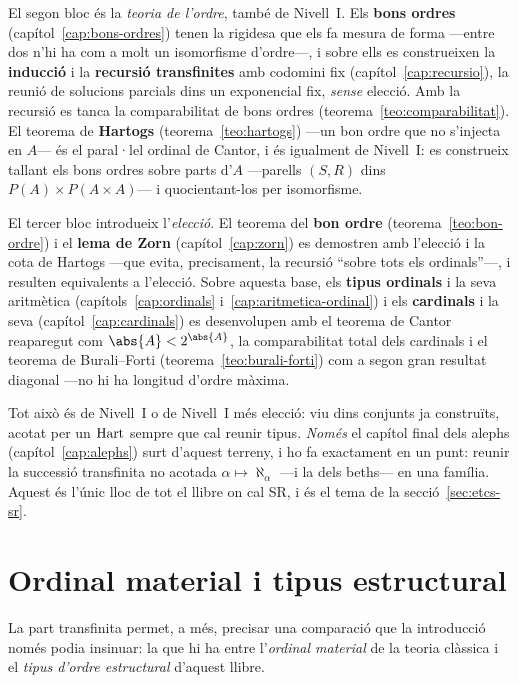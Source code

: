 El segon bloc és la \emph{teoria de l'ordre}, també de Nivell~I. Els
\textbf{bons ordres} (capítol~\ref{cap:bons-ordres}) tenen la rigidesa que
els fa mesura de forma ---entre dos n'hi ha com a molt un isomorfisme
d'ordre---, i sobre ells es construeixen la \textbf{inducció} i la
\textbf{recursió transfinites} amb codomini fix (capítol~\ref{cap:recursio}),
la reunió de solucions parcials dins un exponencial fix, \emph{sense}
elecció. Amb la recursió es tanca la comparabilitat de bons ordres
(teorema~\ref{teo:comparabilitat}). El teorema de \textbf{Hartogs}
(teorema~\ref{teo:hartogs}) ---un bon ordre que no s'injecta en \(A\)--- és
el paral·lel ordinal de Cantor, i és igualment de Nivell~I: es construeix
tallant els bons ordres sobre parts d'\(A\) ---parells \((S,R)\) dins
\(P(A)\times P(A\times A)\)--- i quocientant-los per isomorfisme.

El tercer bloc introdueix l'\emph{elecció}. El teorema del \textbf{bon
ordre} (teorema~\ref{teo:bon-ordre}) i el \textbf{lema de Zorn}
(capítol~\ref{cap:zorn}) es demostren amb l'elecció i la cota de Hartogs
---que evita, precisament, la recursió \enquote{sobre tots els ordinals}---,
i resulten equivalents a l'elecció. Sobre aquesta base, els \textbf{tipus
ordinals} i la seva aritmètica (capítols~\ref{cap:ordinals}
i~\ref{cap:aritmetica-ordinal}) i els \textbf{cardinals} i la seva
(capítol~\ref{cap:cardinals}) es desenvolupen amb el teorema de Cantor
reaparegut com \(\abs{A}<2^{\abs{A}}\), la comparabilitat total dels
cardinals i el teorema de Burali--Forti (teorema~\ref{teo:burali-forti}) com
a segon gran resultat diagonal ---no hi ha longitud d'ordre màxima.

Tot això és de Nivell~I o de Nivell~I més elecció: viu dins conjunts ja
construïts, acotat per un \(\operatorname{Hart}\) sempre que cal reunir tipus. \emph{Només}
el capítol final dels alephs (capítol~\ref{cap:alephs}) surt d'aquest terreny,
i ho fa exactament en un punt: reunir la successió transfinita no acotada
\(\alpha\mapsto\aleph_\alpha\) ---i la dels beths--- en una família. Aquest
és l'únic lloc de tot el llibre on cal SR, i és el tema de la
secció~\ref{sec:etcs-sr}.

\section{Ordinal material i tipus estructural}\label{sec:vonneumann}

La part transfinita permet, a més, precisar una comparació que la
introducció només podia insinuar: la que hi ha entre l'\emph{ordinal
material} de la teoria clàssica i el \emph{tipus d'ordre estructural}
d'aquest llibre.

